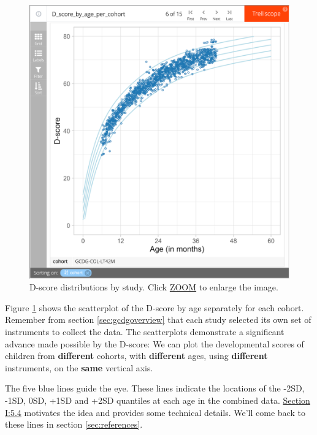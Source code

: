\documentclass[
]{book}
\begin{document}
\begin{figure}

{\centering \includegraphics[width=1\linewidth]{fig/fig_6.1} 

}

\caption{D-score distributions by study. Click \href{https://d-score.org/dbook-apps/gcdgdscores/\#display=by_cohort\&nrow=1\&ncol=1\&arr=row\&pg=6\&labels=cohort\&sort=cohort;asc\&filter=\&sidebar=\&fv=}{ZOOM} to enlarge the image.}\label{fig:dscoredist}
\end{figure}



Figure \ref{fig:dscoredist} shows the scatterplot of the D-score by age separately for each cohort. Remember from section \ref{sec:gcdgoverview} that each study selected its own set of instruments to collect the data. The scatterplots demonstrate a significant advance made possible by the D-score: We can plot the developmental scores of children from \textbf{different} cohorts, with \textbf{different} ages, using \textbf{different} instruments, on the \textbf{same} vertical axis.

The five blue lines guide the eye. These lines indicate the locations of the -2SD, -1SD, 0SD, +1SD and +2SD quantiles at each age in the combined data. \href{https://d-score.org/dbook1/sec-reference.html}{Section I:5.4} motivates the idea and provides some technical details. We'll come back to these lines in section \ref{sec:references}.
\end{document}
